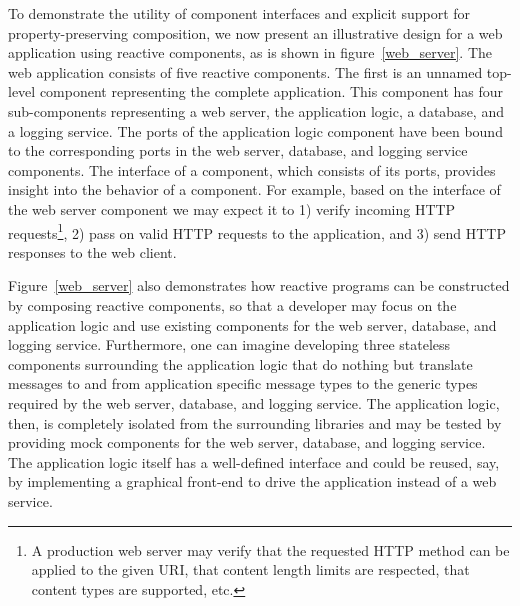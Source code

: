 To demonstrate the utility of component interfaces and explicit support for property-preserving composition, we now present an illustrative design for a web application using reactive components, as is shown in figure~\ref{web_server}.
The web application consists of five reactive components.
The first is an unnamed top-level component representing the complete application.
This component has four sub-components representing a web server, the application logic, a database, and a logging service.
The ports of the application logic component have been bound to the corresponding ports in the web server, database, and logging service components.
The interface of a component, which consists of its ports, provides insight into the behavior of a component.
For example, based on the interface of the web server component we may expect it to 1) verify incoming HTTP requests\footnote{A production web server may verify that the requested HTTP method can be applied to the given URI, that content length limits are respected, that content types are supported, etc.}, 2) pass on valid HTTP requests to the application, and 3) send HTTP responses to the web client.

Figure~\ref{web_server} also demonstrates how reactive programs can be constructed by composing reactive components, so that a developer may focus on the application logic and use existing components for the web server, database, and logging service.
Furthermore, one can imagine developing three stateless components surrounding the application logic that do nothing but translate messages to and from application specific message types to the generic types required by the web server, database, and logging service.
The application logic, then, is completely isolated from the surrounding libraries and may be tested by providing mock components for the web server, database, and logging service.
The application logic itself has a well-defined interface and could be reused, say, by implementing a graphical front-end to drive the application instead of a web service.

